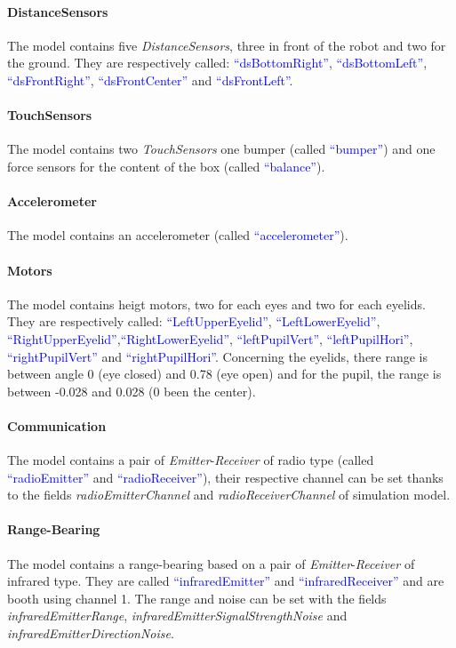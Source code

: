 \documentclass[a4paper,11pt]{report}
\begin{document}
\paragraph{DistanceSensors} The model contains five \textit{DistanceSensors}, three in front of the robot and two for the ground. They are respectively called: \textcolor{blue}{“dsBottomRight”}, \textcolor{blue}{“dsBottomLeft”}, \textcolor{blue}{“dsFrontRight”}, \textcolor{blue}{“dsFrontCenter”} and \textcolor{blue}{“dsFrontLeft”}.

\paragraph{TouchSensors} The model contains two \textit{TouchSensors} one bumper (called \textcolor{blue}{“bumper”}) and one force sensors for the content of the box (called \textcolor{blue}{“balance”}).

\paragraph{Accelerometer} The model contains an accelerometer (called \textcolor{blue}{“accelerometer”}).

\paragraph{Motors} The model contains heigt motors, two for each eyes and two for each eyelids. They are respectively called: \textcolor{blue}{“LeftUpperEyelid”}, \textcolor{blue}{“LeftLowerEyelid”}, \textcolor{blue}{“RightUpperEyelid”},\textcolor{blue}{“RightLowerEyelid”}, \textcolor{blue}{“leftPupilVert”}, \textcolor{blue}{“leftPupilHori”}, \textcolor{blue}{“rightPupilVert”} and \textcolor{blue}{“rightPupilHori”}. Concerning the eyelids, there range is between angle 0 (eye closed) and 0.78 (eye open) and for the pupil, the range is between -0.028 and 0.028 (0 been the center).

\paragraph{Communication} The model contains a pair of \textit{Emitter}-\textit{Receiver} of radio type (called \textcolor{blue}{“radioEmitter”} and \textcolor{blue}{“radioReceiver”}), their respective channel can be set thanks to the fields \textit{radioEmitterChannel} and \textit{radioReceiverChannel} of simulation model.

\paragraph{Range-Bearing} The model contains a range-bearing based on a pair of \textit{Emitter}-\textit{Receiver} of infrared type. They are called \textcolor{blue}{“infraredEmitter”} and \textcolor{blue}{“infraredReceiver”} and are booth using channel 1. The range and noise can be set with the fields \textit{infraredEmitterRange}, \textit{infraredEmitterSignalStrengthNoise} and \textit{infraredEmitterDirectionNoise}.
\end{document}

